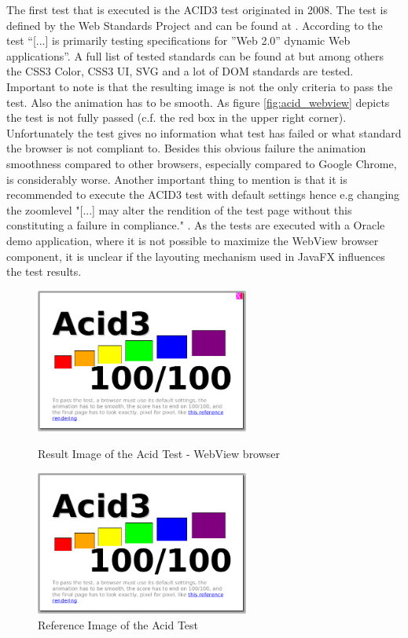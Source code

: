 The first test that is executed is the ACID3 test originated in 2008.
The test is defined by the Web Standards Project and can be found at \autocite{tech-ana:acid3}.
According to \autocite{tech-ana:acid3} the test \enquote{[...] is primarily testing specifications for ''Web 2.0'' dynamic Web applications}. 
A full list of tested standards can be found at \autocite{tech-ana:acid3} but among others the CSS3 Color, CSS3 UI, SVG and a lot of DOM standards are tested.
Important to note is that the resulting image is not the only criteria to pass the test.
Also the animation has to be smooth.
As figure \ref{fig:acid_webview} depicts the test is not fully passed (c.f. the red box in the upper right corner).
Unfortunately the test gives no information what test has failed or what standard the browser is not compliant to.
Besides this obvious failure the animation smoothness compared to other browsers, especially compared to Google Chrome, is considerably worse.
Another important thing to mention is that it is recommended to execute the ACID3 test with default settings hence e.g changing the zoomlevel "[...] may alter the rendition of the test page without this constituting a failure in compliance." \autocite{tech-ana:acid3}.
As the tests are executed with a Oracle demo application, where it is not possible to maximize the WebView browser component, it is unclear if the layouting mechanism used in JavaFX influences the test results.

\begin{figure}
\begin{minipage}[t]{7cm}
	\centering
	\includegraphics[width=7cm]{./img/tech-ana/acid_result_webView.png}
	\caption{Result Image of the Acid Test - WebView browser}
	\label{fig:acid_webview}
\end{minipage}
\hfill
\begin{minipage}[t]{7cm}
	\centering
	\includegraphics[width=7cm]{./img/tech-ana/acid_reference.png}
	\caption{Reference Image of the Acid Test}
	\label{fig:acid_reference}
\end{minipage}
\end{figure}

